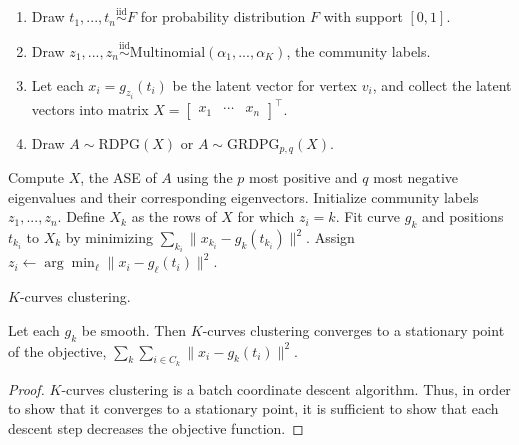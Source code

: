 \documentclass[12pt]{article}
\providecommand{\tightlist}{%
  \setlength{\itemsep}{0pt}\setlength{\parskip}{0pt}}
\begin{document}
\begin{enumerate}
\def\labelenumi{\arabic{enumi}.}
\tightlist
\item
  Draw \(t_1, ..., t_n \stackrel{\mathrm{iid}}{\sim}F\) for probability
  distribution \(F\) with support \([0, 1]\).
\item
  Draw
  \(z_1, ..., z_n \stackrel{\mathrm{iid}}{\sim}\mathrm{Multinomial}(\alpha_1, ..., \alpha_K)\),
  the community labels.
\item
  Let each \(x_i = g_{z_i}(t_i)\) be the latent vector for vertex
  \(v_i\), and collect the latent vectors into matrix
  \(X = \begin{bmatrix} x_1 & \cdots & x_n \end{bmatrix}^\top\).
\item
  Draw \(A \sim \mathrm{RDPG}(X)\) or
  \(A \sim \mathrm{GRDPG}_{p,q}(X)\).
\end{enumerate}

\begin{algorithm}[h]
\DontPrintSemicolon
\SetAlgoLined
{}
Compute $X$, the ASE of $A$ using the $p$ most positive and $q$ most negative eigenvalues and their corresponding eigenvectors.\;
Initialize community labels $z_1, ..., z_n$.\;
 {
 {
Define $X_k$ as the rows of $X$ for which $z_i = k$.\;
Fit curve $g_k$ and positions $t_{k_i}$ to $X_k$ by minimizing $\sum_{k_i} \|x_{k_i} - g_k(t_{k_i})\|^2$.\;
}
 {
Assign $z_i \leftarrow \arg\min_\ell \|x_i - g_\ell(t_i)\|^2$.\
}
}
\caption{$K$-curves clustering.}
\end{algorithm}

\begin{theorem}
\label{k-curves-clustering}
Let each $g_k$ be smooth. 
Then $K$-curves clustering converges to a stationary point of the objective, 
$\sum_k \sum_{i \in C_k} \|x_i - g_k(t_i)\|^2$.
\end{theorem}

\begin{proof}
$K$-curves clustering is a batch coordinate descent algorithm. 
Thus, in order to show that it converges to a stationary point, it is sufficient to show that each descent step decreases the objective function. 
\end{proof}
\end{document}

